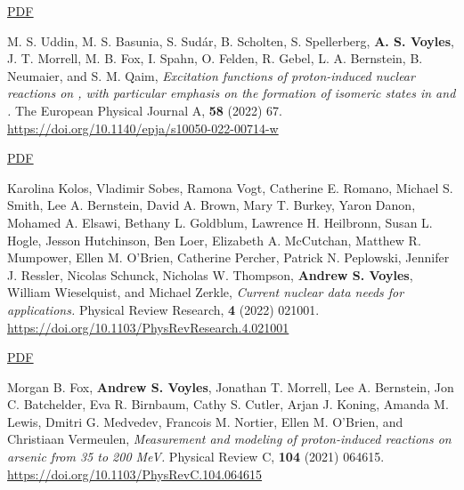 \begin{bibsection}
\ifshort \vspace{0.1cm} \href{https://avoyles.github.io/papers/Stevenson2022_dogbones.pdf}{\underline{PDF}} \else  \fi 

\item M. S. Uddin, M. S. Basunia, S. Sudár, B. Scholten, S. Spellerberg, \textbf{A. S. Voyles}, J. T. Morrell, M. B. Fox, I. Spahn, O. Felden, R. Gebel, L. A. Bernstein, B. Neumaier, and S. M. Qaim, \emph{Excitation functions of proton-induced nuclear reactions on , with particular emphasis on the formation of isomeric states in  and .} The European Physical Journal A, \textbf{58} (2022) 67. \url{https://doi.org/10.1140/epja/s10050-022-00714-w}

\ifshort \vspace{0.1cm} \href{https://avoyles.github.io/papers/Uddin2022_86Sr.pdf}{\underline{PDF}} \else  \fi

\item Karolina Kolos,  Vladimir Sobes,  Ramona Vogt, Catherine E. Romano,  Michael S. Smith,  Lee A. Bernstein, David A. Brown,  Mary T. Burkey,  Yaron Danon,  Mohamed A. Elsawi,  Bethany L. Goldblum, Lawrence H. Heilbronn,  Susan L. Hogle,  Jesson Hutchinson,  Ben Loer,  Elizabeth A. McCutchan, Matthew R. Mumpower,  Ellen M. O’Brien,  Catherine Percher,  Patrick N. Peplowski,  Jennifer J. Ressler, Nicolas Schunck,  Nicholas W. Thompson,  \textbf{Andrew S. Voyles},  William Wieselquist,  and Michael Zerkle, \emph{Current nuclear data needs for applications.} Physical Review Research, \textbf{4} (2022) 021001. \url{https://doi.org/10.1103/PhysRevResearch.4.021001} 

\ifshort \vspace{0.1cm} \href{https://avoyles.github.io/papers/Kolos2022_WANDA.pdf}{\underline{PDF}} \else  \fi 



\item Morgan B. Fox,  \textbf{Andrew S. Voyles}, Jonathan T. Morrell,  Lee A. Bernstein, Jon C. Batchelder, Eva R. Birnbaum,  Cathy S. Cutler,  Arjan J. Koning,  Amanda M. Lewis,  Dmitri G. Medvedev, Francois M. Nortier,  Ellen M. O’Brien,  and Christiaan Vermeulen, \emph{Measurement and modeling of proton-induced reactions on arsenic from 35 to 200 MeV.} Physical Review C, \textbf{104} (2021) 064615. \url{https://doi.org/10.1103/PhysRevC.104.064615} 


\end{bibsection}
